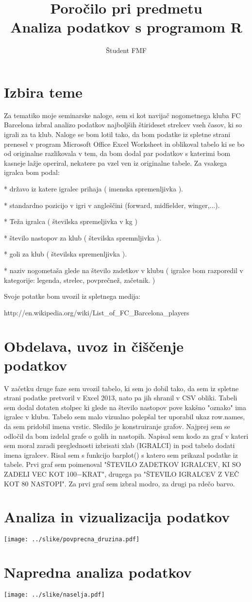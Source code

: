 \documentclass[11pt,a4paper]{article}
\begin{document}
\title{Poročilo pri predmetu \\
Analiza podatkov s programom R}
\author{Študent FMF}
\maketitle

\section{Izbira teme}

Za tematiko moje seminarske naloge, sem si kot navijač nogometnega kluba FC Barcelona izbral analizo podatkov najboljših štirideset strelcev vseh časov, ki so igrali za ta klub. Naloge se bom lotil tako, da bom podatke iz spletne strani prenesel v program Microsoft Office Excel Worksheet in oblikoval tabelo ki se bo od originalne razlikovala v tem, da bom dodal par podatkov s katerimi bom kasneje lažje operiral, nekatere pa vzel ven iz originalne tabele. Za vsakega igralca bom podal:

* državo iz katere igralec prihaja ( imenska spremenljivka ).

* standardno pozicijo v igri v angleščini (forward, midfielder, winger,...).

* Teža igralca ( številska spremeljivka v kg )

* število nastopov za klub ( številska spremnljivka ).

* goli za klub ( številska spremenljivka ).

* naziv nogometaša glede na število zadetkov v klubu ( igralce bom razporedil v kategorije: legenda, strelec, povprečnež, začetnik. )

Svoje potatke bom uvozil iz spletnega medija: 

http://en.wikipedia.org/wiki/List_of_FC_Barcelona_players


\section{Obdelava, uvoz in čiščenje podatkov}
V začetku druge faze sem uvozil tabelo, ki sem jo dobil tako, da sem iz spletne strani podatke pretvoril v Excel 2013, nato pa jih shranil v CSV obliki. Tabeli sem dodal dotaten stolpec ki glede na število nastopov pove kakšno "oznako" ima igralec v klubu. Tabelo sem malo vizualno polepšal ter uporabil ukaz row.names, da sem pridobil imena vrstic. 
Sledilo je konstruiranje grafov. Najprej sem se odločil da bom izdelal grafe o golih in nastopih. Napisal sem kodo za graf v kateri sem moral zaradi preglednosti izbrisati xlab (IGRALCI) in pod tabelo dodati imena igralcev. Risal sem s funkcijo barplot() s katero sem prikazal podatke iz tabele. Prvi graf sem poimenoval "ŠTEVILO ZADETKOV IGRALCEV, KI SO ZADELI VEC KOT 100−KRAT", drugega pa "ŠTEVILO IGRALCEV Z VEČ KOT 80 NASTOPI". Za prvi graf sem izbral modro, za drugi pa rdečo barvo.


\section{Analiza in vizualizacija podatkov}

\texttt{[image: ../slike/povprecna\_druzina.pdf]}

\section{Napredna analiza podatkov}

\texttt{[image: ../slike/naselja.pdf]}
\end{document}
